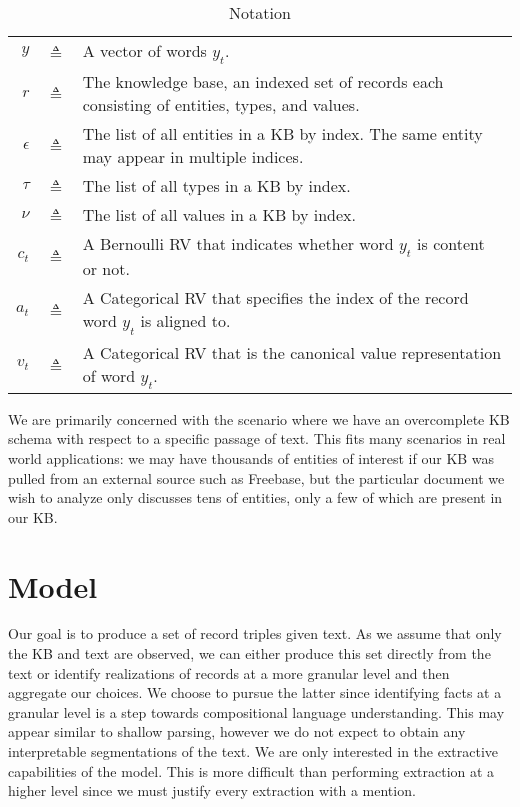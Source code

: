 \documentclass[12pt]{article}
\begin{document}
\begin{table}[htbp]\caption{Notation}
\centering %
\begin{tabular}{r c p{10cm} }
\toprule
$y$ & $\triangleq$ & A vector of words $y_t$.\\
$r$ & $\triangleq$ & The knowledge base,
    an indexed set of records each consisting of entities, types, and values.\\
$\epsilon$ & $\triangleq$ & The list of all entities in a KB by index. The same entity may appear
    in multiple indices.\\
$\tau$ & $\triangleq$ & The list of all types in a KB by index.\\
$\nu$ & $\triangleq$ & The list of all values in a KB by index.\\
$c_t$ & $\triangleq$ & A Bernoulli RV that indicates whether word $y_t$ is content or not.\\
$a_t$ & $\triangleq$ & A Categorical RV that specifies the index of the record word $y_t$
    is aligned to.\\
$v_t$ & $\triangleq$ & A Categorical RV that is the canonical value representation of
    word $y_t$.\\
\bottomrule
\end{tabular}
\label{tab:TableOfNotationForMyResearch}
\end{table}

We are primarily concerned with the scenario where we have an overcomplete KB schema with
respect to a specific passage of text.
This fits many scenarios in real world applications:
we may have thousands of entities of interest if our KB was pulled from an 
external source such as Freebase,
but the particular document we wish to analyze only discusses tens of entities,
only a few of which are present in our KB.



\section{Model}
Our goal is to produce a set of record triples given text.
As we assume that only the KB and text are observed,
we can either produce this set directly from the text or identify realizations of
records at a more granular level and then aggregate our choices.
We choose to pursue the latter since identifying facts at a granular level
is a step towards compositional language understanding.
This may appear similar to shallow parsing, however we do not expect
to obtain any interpretable segmentations of the text.
We are only interested in the extractive capabilities of the model.
This is more difficult than performing extraction at a higher level
since we must justify every extraction with a mention.
\end{document}
